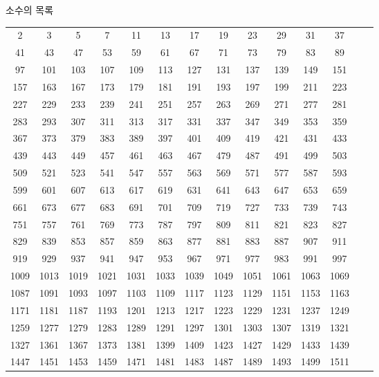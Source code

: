 \documentclass[10pt, a4paper]{article}
\begin{document}
\begin{center}
    \huge{소수의 목록}\normalsize\\
    \begin{longtable}{c c c c c c c c c c c c c c}
        \hline
        2 & 3 & 5 & 7 & 11 & 13 & 17 & 19 & 23 & 29 & 31 & 37 \\
        41 & 43 & 47 & 53 & 59 & 61 & 67 & 71 & 73 & 79 & 83 & 89 \\
        97 & 101 & 103 & 107 & 109 & 113 & 127 & 131 & 137 & 139 & 149 & 151 \\
        157 & 163 & 167 & 173 & 179 & 181 & 191 & 193 & 197 & 199 & 211 & 223 \\
        227 & 229 & 233 & 239 & 241 & 251 & 257 & 263 & 269 & 271 & 277 & 281 \\
        283 & 293 & 307 & 311 & 313 & 317 & 331 & 337 & 347 & 349 & 353 & 359 \\
        367 & 373 & 379 & 383 & 389 & 397 & 401 & 409 & 419 & 421 & 431 & 433 \\
        439 & 443 & 449 & 457 & 461 & 463 & 467 & 479 & 487 & 491 & 499 & 503 \\
        509 & 521 & 523 & 541 & 547 & 557 & 563 & 569 & 571 & 577 & 587 & 593 \\
        599 & 601 & 607 & 613 & 617 & 619 & 631 & 641 & 643 & 647 & 653 & 659 \\
        661 & 673 & 677 & 683 & 691 & 701 & 709 & 719 & 727 & 733 & 739 & 743 \\
        751 & 757 & 761 & 769 & 773 & 787 & 797 & 809 & 811 & 821 & 823 & 827 \\
        829 & 839 & 853 & 857 & 859 & 863 & 877 & 881 & 883 & 887 & 907 & 911 \\
        919 & 929 & 937 & 941 & 947 & 953 & 967 & 971 & 977 & 983 & 991 & 997 \\
        1009 & 1013 & 1019 & 1021 & 1031 & 1033 & 1039 & 1049 & 1051 & 1061 & 1063 & 1069 \\
        1087 & 1091 & 1093 & 1097 & 1103 & 1109 & 1117 & 1123 & 1129 & 1151 & 1153 & 1163 \\
        1171 & 1181 & 1187 & 1193 & 1201 & 1213 & 1217 & 1223 & 1229 & 1231 & 1237 & 1249 \\
        1259 & 1277 & 1279 & 1283 & 1289 & 1291 & 1297 & 1301 & 1303 & 1307 & 1319 & 1321 \\
        1327 & 1361 & 1367 & 1373 & 1381 & 1399 & 1409 & 1423 & 1427 & 1429 & 1433 & 1439 \\
        1447 & 1451 & 1453 & 1459 & 1471 & 1481 & 1483 & 1487 & 1489 & 1493 & 1499 & 1511 \\

\end{longtable}
\end{center}
\end{document}
